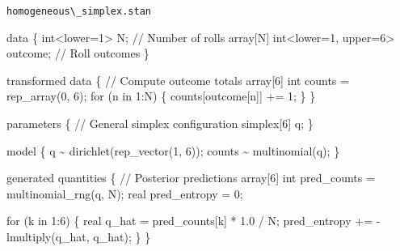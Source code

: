 \documentclass[
  letterpaper,
  DIV=11,
  numbers=noendperiod]{scrartcl}
\newenvironment{Shaded}{\begin{snugshade}}{\end{snugshade}}
\newcommand{\CommentTok}[1]{\textcolor[rgb]{0.37,0.37,0.37}{#1}}
\newcommand{\ControlFlowTok}[1]{\textcolor[rgb]{0.00,0.23,0.31}{#1}}
\newcommand{\DataTypeTok}[1]{\textcolor[rgb]{0.68,0.00,0.00}{#1}}
\newcommand{\DecValTok}[1]{\textcolor[rgb]{0.68,0.00,0.00}{#1}}
\newcommand{\FloatTok}[1]{\textcolor[rgb]{0.68,0.00,0.00}{#1}}
\newcommand{\KeywordTok}[1]{\textcolor[rgb]{0.00,0.23,0.31}{#1}}
\newcommand{\NormalTok}[1]{\textcolor[rgb]{0.00,0.23,0.31}{#1}}
\begin{document}
\begin{codelisting}

\caption{\texttt{homogeneous\textbackslash\_simplex.stan}}

\begin{Shaded}
\begin{Highlighting}[]
\KeywordTok{data}\NormalTok{ \{}
  \DataTypeTok{int}\NormalTok{\textless{}}\KeywordTok{lower}\NormalTok{=}\DecValTok{1}\NormalTok{\textgreater{} N;                         }\CommentTok{// Number of rolls}
  \DataTypeTok{array}\NormalTok{[N] }\DataTypeTok{int}\NormalTok{\textless{}}\KeywordTok{lower}\NormalTok{=}\DecValTok{1}\NormalTok{, }\KeywordTok{upper}\NormalTok{=}\DecValTok{6}\NormalTok{\textgreater{} outcome; }\CommentTok{// Roll outcomes}
\NormalTok{\}}

\KeywordTok{transformed data}\NormalTok{ \{}
  \CommentTok{// Compute outcome totals}
  \DataTypeTok{array}\NormalTok{[}\DecValTok{6}\NormalTok{] }\DataTypeTok{int}\NormalTok{ counts = rep\_array(}\DecValTok{0}\NormalTok{, }\DecValTok{6}\NormalTok{);}
  \ControlFlowTok{for}\NormalTok{ (n }\ControlFlowTok{in} \DecValTok{1}\NormalTok{:N) \{}
\NormalTok{    counts[outcome[n]] += }\DecValTok{1}\NormalTok{;}
\NormalTok{  \}}
\NormalTok{\}}

\KeywordTok{parameters}\NormalTok{ \{}
  \CommentTok{// General simplex configuration}
  \DataTypeTok{simplex}\NormalTok{[}\DecValTok{6}\NormalTok{] q;}
\NormalTok{\}}

\KeywordTok{model}\NormalTok{ \{}
\NormalTok{  q \textasciitilde{} dirichlet(rep\_vector(}\DecValTok{1}\NormalTok{, }\DecValTok{6}\NormalTok{));}
\NormalTok{  counts \textasciitilde{} multinomial(q);}
\NormalTok{\}}

\KeywordTok{generated quantities}\NormalTok{ \{}
  \CommentTok{// Posterior predictions}
  \DataTypeTok{array}\NormalTok{[}\DecValTok{6}\NormalTok{] }\DataTypeTok{int}\NormalTok{ pred\_counts = multinomial\_rng(q, N);}
  \DataTypeTok{real}\NormalTok{ pred\_entropy = }\DecValTok{0}\NormalTok{;}

  \ControlFlowTok{for}\NormalTok{ (k }\ControlFlowTok{in} \DecValTok{1}\NormalTok{:}\DecValTok{6}\NormalTok{) \{}
    \DataTypeTok{real}\NormalTok{ q\_hat = pred\_counts[k] * }\FloatTok{1.0}\NormalTok{ / N;}
\NormalTok{    pred\_entropy += {-} lmultiply(q\_hat, q\_hat);}
\NormalTok{  \}}
\NormalTok{\}}
\end{Highlighting}
\end{Shaded}

\end{codelisting}
\end{document}
